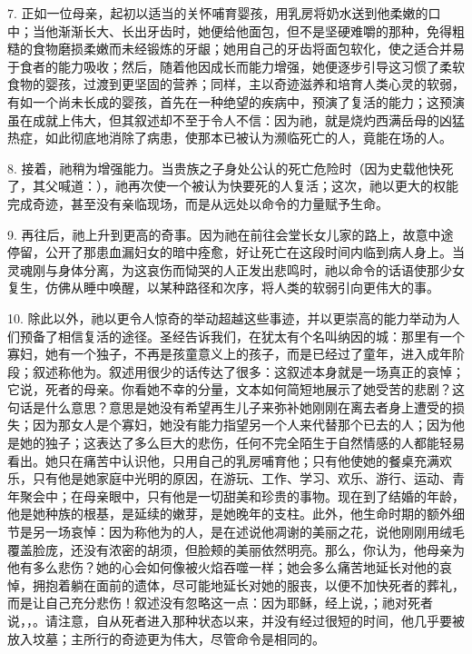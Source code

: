 7. 正如一位母亲，起初以适当的关怀哺育婴孩，用乳房将奶水送到他柔嫩的口中；当他渐渐长大、长出牙齿时，她便给他面包，但不是坚硬难嚼的那种，免得粗糙的食物磨损柔嫩而未经锻炼的牙龈；她用自己的牙齿将面包软化，使之适合并易于食者的能力吸收；然后，随着他因成长而能力增强，她便逐步引导这习惯了柔软食物的婴孩，过渡到更坚固的营养；同样，主以奇迹滋养和培育人类心灵的软弱，有如一个尚未长成的婴孩，首先在一种绝望的疾病中，预演了复活的能力；这预演虽在成就上伟大，但其叙述却不至于令人不信：因为祂，就是烧灼西满岳母的凶猛热症，如此彻底地消除了病患，使那本已被认为濒临死亡的人，竟能在场的人。\par

8. 接着，祂稍为增强能力。当贵族之子身处公认的死亡危险时（因为史载他快死了，其父喊道：），祂再次使一个被认为快要死的人复活；这次，祂以更大的权能完成奇迹，甚至没有亲临现场，而是从远处以命令的力量赋予生命。\par

9. 再往后，祂上升到更高的奇事。因为祂在前往会堂长女儿家的路上，故意中途停留，公开了那患血漏妇女的暗中痊愈，好让死亡在这段时间内临到病人身上。当灵魂刚与身体分离，为这哀伤而恸哭的人正发出悲鸣时，祂以命令的话语使那少女复生，仿佛从睡中唤醒，以某种路径和次序，将人类的软弱引向更伟大的事。\par

10. 除此以外，祂以更令人惊奇的举动超越这些事迹，并以更崇高的能力举动为人们预备了相信复活的途径。圣经告诉我们，在犹太有个名叫纳因的城：那里有一个寡妇，她有一个独子，不再是孩童意义上的孩子，而是已经过了童年，进入成年阶段；叙述称他为。叙述用很少的话传达了很多：这叙述本身就是一场真正的哀悼；它说，死者的母亲。你看她不幸的分量，文本如何简短地展示了她受苦的悲剧？这句话是什么意思？意思是她没有希望再生儿子来弥补她刚刚在离去者身上遭受的损失；因为那女人是个寡妇，她没有能力指望另一个人来代替那个已去的人；因为他是她的独子；这表达了多么巨大的悲伤，任何不完全陌生于自然情感的人都能轻易看出。她只在痛苦中认识他，只用自己的乳房哺育他；只有他使她的餐桌充满欢乐，只有他是她家庭中光明的原因，在游玩、工作、学习、欢乐、游行、运动、青年聚会中；在母亲眼中，只有他是一切甜美和珍贵的事物。现在到了结婚的年龄，他是她种族的根基，是延续的嫩芽，是她晚年的支柱。此外，他生命时期的额外细节是另一场哀悼：因为称他为的人，是在述说他凋谢的美丽之花，说他刚刚用绒毛覆盖脸庞，还没有浓密的胡须，但脸颊的美丽依然明亮。那么，你认为，他母亲为他有多么悲伤？她的心会如何像被火焰吞噬一样；她会多么痛苦地延长对他的哀悼，拥抱着躺在面前的遗体，尽可能地延长对她的服丧，以便不加快死者的葬礼，而是让自己充分悲伤！叙述没有忽略这一点：因为耶稣，经上说，；祂对死者说，，。请注意，自从死者进入那种状态以来，并没有经过很短的时间，他几乎要被放入坟墓；主所行的奇迹更为伟大，尽管命令是相同的。\par

